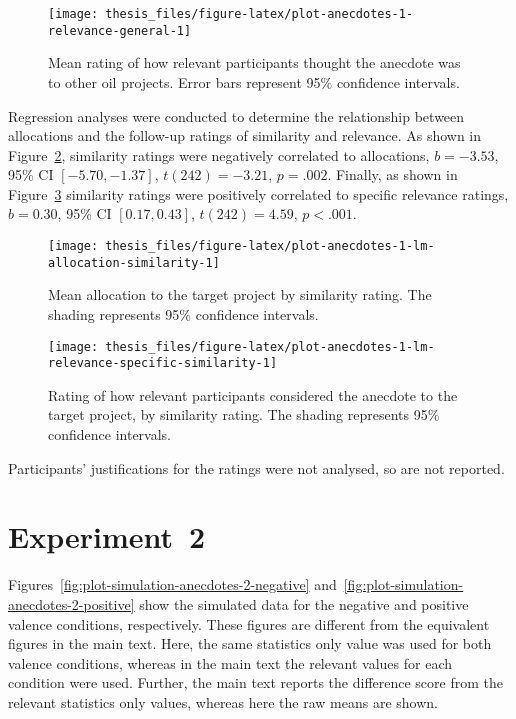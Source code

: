 \documentclass[a4paper, nobind]{templates/ociamthesis}
\theoremstyle{definition}
\theoremstyle{definition}
\theoremstyle{definition}
\theoremstyle{definition}
\theoremstyle{remark}
\begin{document}
\begin{figure}
\texttt{[image: thesis\_files/figure-latex/plot-anecdotes-1-relevance-general-1]} \caption{Mean rating of how relevant participants thought the anecdote was to other oil projects. Error bars represent 95\% confidence intervals.}\label{fig:plot-anecdotes-1-relevance-general}
\end{figure}

Regression analyses were conducted to determine the relationship between
allocations and the follow-up ratings of similarity and relevance. As shown in
Figure~\ref{fig:plot-anecdotes-1-lm-allocation-similarity}, similarity ratings
were negatively correlated to allocations,
\(b = -3.53\), 95\% CI \([-5.70, -1.37]\), \(t(242) = -3.21\), \(p = .002\). Finally, as shown in
Figure~\ref{fig:plot-anecdotes-1-lm-relevance-specific-similarity} similarity
ratings were positively correlated to specific relevance ratings,
\(b = 0.30\), 95\% CI \([0.17, 0.43]\), \(t(242) = 4.59\), \(p < .001\).




\begin{figure}
\texttt{[image: thesis\_files/figure-latex/plot-anecdotes-1-lm-allocation-similarity-1]} \caption{Mean allocation to the target
project by similarity rating. The shading represents 95\% confidence intervals.}\label{fig:plot-anecdotes-1-lm-allocation-similarity}
\end{figure}



\begin{figure}
\texttt{[image: thesis\_files/figure-latex/plot-anecdotes-1-lm-relevance-specific-similarity-1]} \caption{Rating of how relevant participants considered the anecdote to the target project, by similarity rating. The shading represents 95\% confidence intervals.}\label{fig:plot-anecdotes-1-lm-relevance-specific-similarity}
\end{figure}

Participants' justifications for the ratings were not analysed, so are not reported.

\hypertarget{anecdotes-2-appendix}{%
\section{Experiment~2}\label{anecdotes-2-appendix}}

Figures~\ref{fig:plot-simulation-anecdotes-2-negative}
and~\ref{fig:plot-simulation-anecdotes-2-positive} show the simulated data for
the negative and positive valence conditions, respectively. These figures are
different from the equivalent figures in the main text. Here, the same
statistics only value was used for both valence conditions, whereas in the main
text the relevant values for each condition were used. Further, the main text
reports the difference score from the relevant statistics only values, whereas
here the raw means are shown.
\end{document}
